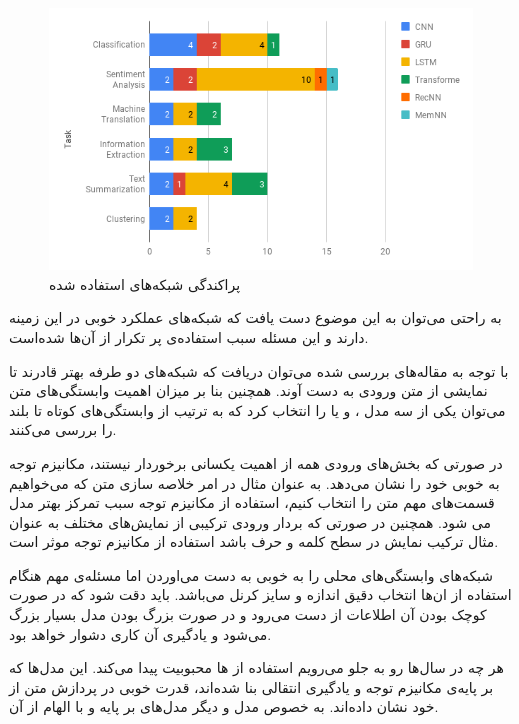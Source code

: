 \documentclass[12pt, a4paper, oneside]{report}
\begin{document}
\begin{figure}[!ht]
    \centering
    \includegraphics[width=\textwidth]{dist}
    \caption{پراکندگی شبکه‌های استفاده شده}
    \label{fig:dist}
\end{figure}

به راحتی می‌توان به این موضوع دست یافت که شبکه‌های
عملکرد خوبی در این زمینه دارند و این مسئله سبب استفاده‌ی پر تکرار از آن‌ها شده‌است.

با توجه به مقاله‌های بررسی شده می‌توان دریافت که شبکه‌های
دو طرفه بهتر قادرند تا نمایشی از متن ورودی به دست آوند. همچنین بنا بر میزان اهمیت وابستگی‌های متن
می‌توان یکی از سه مدل
،
و یا
را انتخاب کرد که به ترتیب از وابستگی‌‌های کوتاه تا بلند را بررسی می‌کنند.

در صورتی که بخش‌های ورودی همه از اهمیت یکسانی برخوردار نیستند، مکانیزم توجه به خوبی خود را نشان می‌دهد.
به عنوان مثال در امر خلاصه سازی متن که می‌خواهیم قسمت‌های مهم متن را انتخاب کنیم، استفاده از مکانیزم توجه
سبب تمرکز بهتر مدل می شود. همچنین در صورتی که بردار ورودی ترکیبی از نمایش‌های مختلف به عنوان مثال
ترکیب نمایش در سطح کلمه و حرف باشد استفاده از مکانیزم توجه موثر است.

شبکه‌های
وابستگی‌های محلی را به خوبی به دست می‌اوردن اما مسئله‌ی مهم هنگام استفاده از ان‌ها انتخاب دقیق اندازه و سایز کرنل‌
می‌باشد. باید دقت شود که در صورت کوچک بودن آن اطلاعات از دست می‌رود و در صورت بزرگ بودن
مدل بسیار بزرگ می‌شود و یادگیری آن کاری دشوار خواهد بود.

هر چه در سال‌ها رو به جلو می‌رویم استفاده از
ها محبوبیت پیدا می‌کند. این مدل‌ها که بر پایه‌ی مکانیزم توجه و یادگیری انتقالی بنا شده‌اند، قدرت خوبی در پردازش متن از
خود نشان داده‌اند. به خصوص مدل
و دیگر مدل‌های بر پایه و با الهام از آن.
\end{document}
